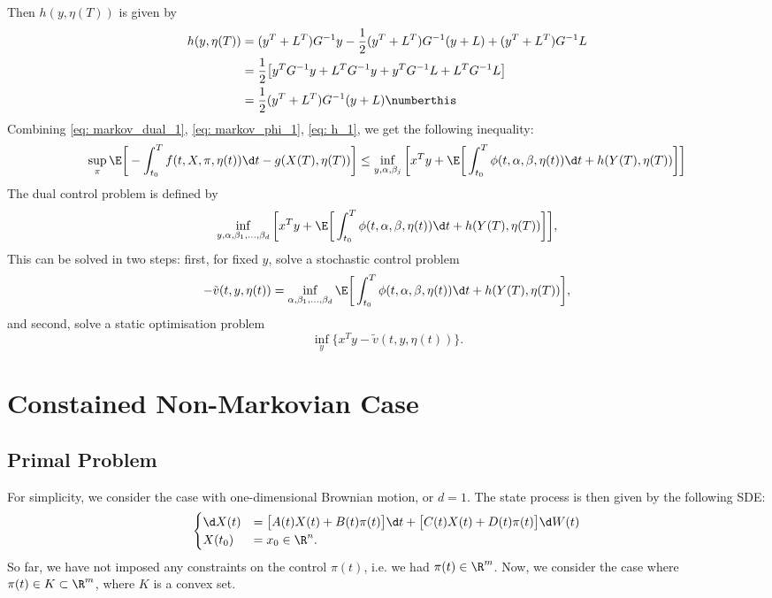Then $h(y, \eta(T))$ is given by
\begin{align*}
    h(y, \eta(T)) &= (y^T + L^T) G^{-1} y - \frac12 (y^T + L^T)G^{-1}(y + L) + (y^T + L^T) G^{-1} L\\
    &= \frac12 \big[ y^T G^{-1} y +  L^T G^{-1} y + y^T G^{-1} L + L^T G^{-1} L\big]\\
    &= \frac12 (y^T + L^T)G^{-1}(y + L)\numberthis \label{eq: markov_h}
\end{align*}
Combining \eqref{eq: markov_dual_1}, \eqref{eq: markov_phi_1}, \eqref{eq: h_1}, we get the following inequality:
\begin{equation}
    \sup_\pi \E \bigg[ -\int_{t_0}^T f(t,X,\pi, \eta(t)) \d t - g(X(T), \eta(T)) \bigg] \le \inf_{y, \alpha, \beta_j} \bigg[ x^T y + \E\bigg[\int_{t_0}^T \phi(t,\alpha, \beta, \eta(t) ) \d t + h(Y(T), \eta(T)) \bigg] \bigg] \label{eq: markov_dual_primal_inequality}
\end{equation}
The dual control problem is defined by
\begin{equation}
    \inf_{y, \alpha, \beta_1, \dots, \beta_d} \bigg[ x^T y + \E\bigg[\int_{t_0}^T \phi(t,\alpha, \beta, \eta(t) ) \d t + h(Y(T), \eta(T)) \bigg] \bigg], \label{eq: markov_dual_control_problem}
\end{equation}
This can be solved in two steps: first, for fixed $y$, solve a stochastic control problem
\begin{equation}
    - \tilde{v}(t, y, \eta(t)) = \inf_{ \alpha, \beta_1, \dots, \beta_d} \E\bigg[\int_{t_0}^T \phi (t, \alpha, \beta, \eta(t)) \d t + h(Y(T), \eta(T)) \bigg], \label{eq: markov_dual_value_function}
\end{equation}
and second, solve a static optimisation problem
\begin{equation*}
    \inf_y \big\{x^T y - \tilde{v}(t,y, \eta(t))\big\}.
\end{equation*}


\section{Constained Non-Markovian Case}

\subsection{Primal Problem}
 For simplicity, we consider the case with one-dimensional Brownian motion, or $d=1$. The state process is then given by the following SDE:
\begin{equation}
    \begin{cases}
    \d X(t) &= \big[A(t) X(t) + B(t) \pi(t)  \big] \d t + \big[C(t) X(t) + D(t) \pi(t)  \big] \d W(t)\\
    X(t_0) &= x_0 \in \R^n.
    \end{cases} \label{eq: constrained_x_sde}
\end{equation}
So far, we have not imposed any constraints on the control $\pi(t)$, i.e. we had $\pi(t) \in \R^m$. Now, we consider the case where $\pi(t) \in K \subset \R^m$, where $K$ is a convex set.\\

